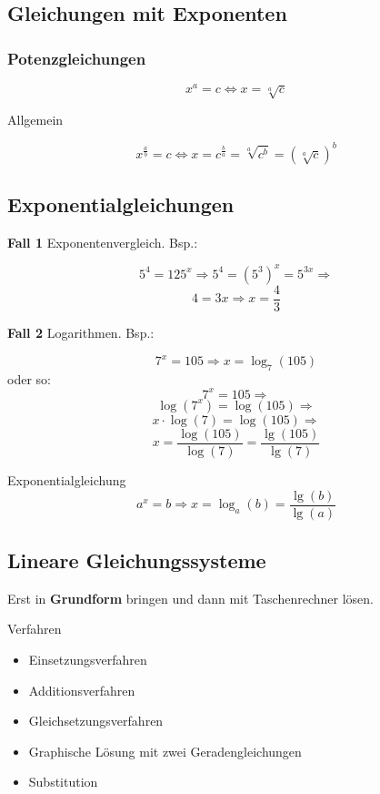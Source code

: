 \begin{multicols}{2}


\subsection{Gleichungen mit Exponenten}
\subsubsection{Potenzgleichungen}

$$x^a=c \Leftrightarrow x=\sqrt[a]{c}$$

Allgemein

$$x^{\frac{a}b} = c \Leftrightarrow{}
x=c^{\frac{b}a} = \sqrt[a]{c^b} = \left(\sqrt[a]c\right)^b$$

\subsection{Exponentialgleichungen}
\textbf{Fall 1} Exponentenvergleich. Bsp.:

$$5^4=125^x \Rightarrow{} 5^4=(5^3)^x=5^{3x} \Rightarrow{}$$
$$ 4=3x \Rightarrow x=\frac43$$

\textbf{Fall 2} Logarithmen. Bsp.:

$$7^x=105 \Rightarrow x=\log_7(105)$$
oder so:
$$7^x=105 \Rightarrow$$
$$ \log(7^x)=\log(105) \Rightarrow$$
$$x\cdot{}\log(7)=\log(105) \Rightarrow$$
$$ x=\frac{\log(105)}{\log(7)} = \frac{\lg(105)}{\lg(7)}$$

\begin{gesetz}{Exponentialgleichung}{}
$$a^x=b \Rightarrow{} x=\log_a(b) = \frac{\lg(b)}{\lg(a)}$$
\end{gesetz}

\subsection{Lineare Gleichungssysteme}
Erst in \textbf{Grundform} bringen und dann
mit Taschenrechner  lösen.

Verfahren
\begin{itemize}
\item Einsetzungsverfahren
\item Additionsverfahren
\item Gleichsetzungsverfahren
\item Graphische Lösung mit zwei Geradengleichungen
\item Substitution
\end{itemize}


\end{multicols}
